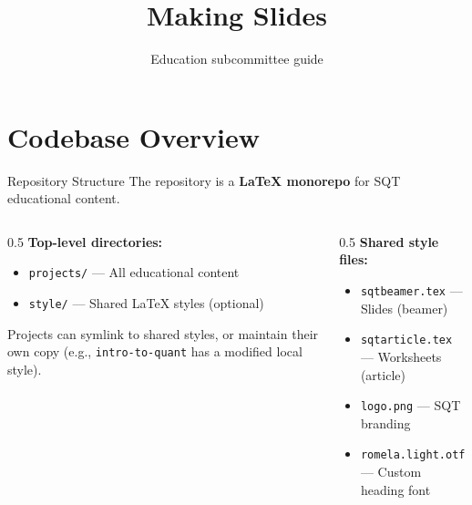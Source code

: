 

\title{Making Slides}
\subtitle{Education subcommittee guide}
\date{}



\maketitle

\section{Codebase Overview}

\begin{frame}{Repository Structure}
  The repository is a \textbf{LaTeX monorepo} for SQT educational content.
  \begin{columns}[T]
    \begin{column}{0.5\textwidth}
      \textbf{Top-level directories:}
      \begin{itemize}
        \item \texttt{projects/} --- All educational content
        \item \texttt{style/} --- Shared LaTeX styles (optional)
      \end{itemize}
      \vspace{0.3cm}
      \small Projects can symlink to shared styles, or maintain their own copy
      (e.g., \texttt{intro-to-quant} has a modified local style).
    \end{column}
    \begin{column}{0.5\textwidth}
      \textbf{Shared style files:}
      \begin{itemize}
        \item \texttt{sqtbeamer.tex} --- Slides (beamer)
        \item \texttt{sqtarticle.tex} --- Worksheets (article)
        \item \texttt{logo.png} --- SQT branding
        \item \texttt{romela.light.otf} --- Custom heading font
      \end{itemize}
    \end{column}
  \end{columns}
\end{frame}

